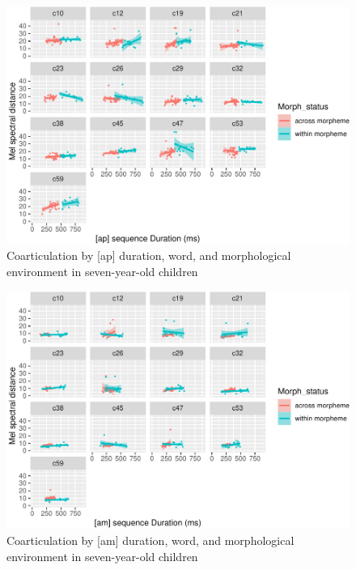 \documentclass[a4paper,man,floatsintext,natbib,donotrepeattitle, apacite]{apa6}
\begin{document}
\begin{figure}
\centering
\includegraphics{3_ch3_results_files/figure-latex/seven-facet-ap-1.pdf}
\caption{\label{fig:seven-facet-ap}Coarticulation by {[}ap{]} duration, word, and morphological environment in seven-year-old children}
\end{figure}

\begin{figure}
\centering
\includegraphics{3_ch3_results_files/figure-latex/seven-facet-am-1.pdf}
\caption{\label{fig:seven-facet-am}Coarticulation by {[}am{]} duration, word, and morphological environment in seven-year-old children}
\end{figure}
\end{document}
